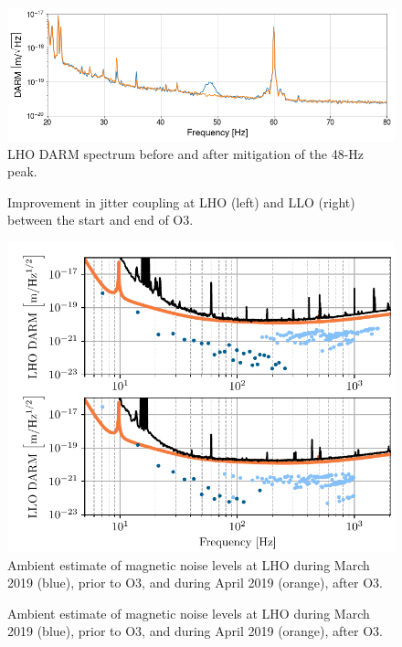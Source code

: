 \documentclass[11pt]{article}
\begin{document}
\begin{figure}
	\centering
	\includegraphics[width=\textwidth]{figures/noise-48Hz.png}
	\caption{LHO DARM spectrum before and after mitigation of the 48-Hz peak.}
	\label{fig:noise-48hz}
\end{figure}

\begin{figure}
	\centering
	\caption{Improvement in jitter coupling at LHO (left) and LLO (right) between the start and end of O3.}
	\label{fig:noise-jitter}
\end{figure}

\begin{figure}[h]
	\centering
	\includegraphics[width=\textwidth]{figures/noise-ambient-mag.pdf}
	\caption{
		Ambient estimate of magnetic noise levels at LHO during March 2019 (blue), prior to O3, and during April 2019 (orange), after O3.}
	\label{fig:noise-ambient-mag}
\end{figure}

\begin{figure}
	\centering
	\caption{
		Ambient estimate of magnetic noise levels at LHO during March 2019 (blue), prior to O3, and during April 2019 (orange), after O3.}
	\label{fig:weekly-mag-preO3}
\end{figure}
\end{document}
